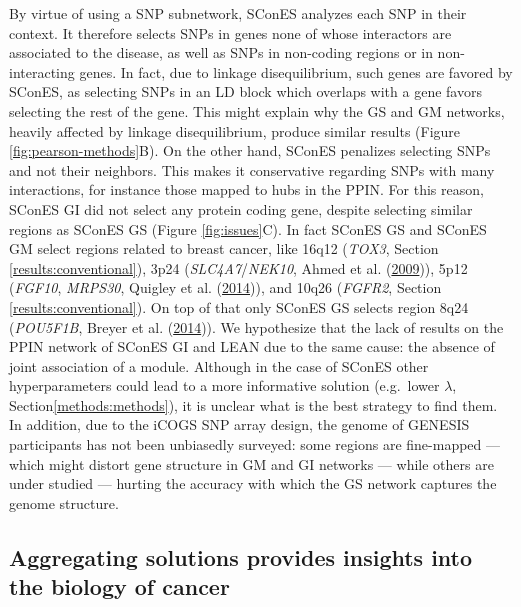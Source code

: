 \documentclass[
  11pt,
]{env/yjiao}
\begin{document}
By virtue of using a SNP subnetwork, SConES analyzes each SNP in their
context. It therefore selects SNPs in genes none of whose interactors
are associated to the disease, as well as SNPs in non-coding regions or
in non-interacting genes. In fact, due to linkage disequilibrium, such
genes are favored by SConES, as selecting SNPs in an LD block which
overlaps with a gene favors selecting the rest of the gene. This might
explain why the GS and GM networks, heavily affected by linkage
disequilibrium, produce similar results (Figure
\ref{fig:pearson-methods}B). On the other hand, SConES penalizes
selecting SNPs and not their neighbors. This makes it conservative
regarding SNPs with many interactions, for instance those mapped to hubs
in the PPIN. For this reason, SConES GI did not select any protein
coding gene, despite selecting similar regions as SConES GS (Figure
\ref{fig:issues}C). In fact SConES GS and SConES GM select
regions related to breast cancer, like 16q12 (\emph{TOX3}, Section
\ref{results:conventional}), 3p24 (\emph{SLC4A7}/\emph{NEK10},
Ahmed et al. (\protect\hyperlink{ref-search_newly_2009}{2009})), 5p12 (\emph{FGF10}, \emph{MRPS30}, Quigley et al. (\protect\hyperlink{ref-quigley_5p12_2014}{2014})), and
10q26 (\emph{FGFR2}, Section \ref{results:conventional}). On top of that only SConES
GS selects region 8q24 (\emph{POU5F1B}, Breyer et al. (\protect\hyperlink{ref-breyer_expressed_2014}{2014})). We hypothesize
that the lack of results on the PPIN network of SConES GI and LEAN due
to the same cause: the absence of joint association of a module.
Although in the case of SConES other hyperparameters could lead to a
more informative solution (e.g.~lower \(\lambda\), Section\ref{methods:methods}),
it is unclear what is the best strategy
to find them. In addition, due to the iCOGS SNP array design, the genome
of GENESIS participants has not been unbiasedly surveyed: some regions
are fine-mapped --- which might distort gene structure in GM and GI
networks --- while others are under studied --- hurting the accuracy
with which the GS network captures the genome structure.

\hypertarget{results:consensus}{%
\subsection{Aggregating solutions provides insights into the biology of cancer}\label{results:consensus}}
\end{document}
